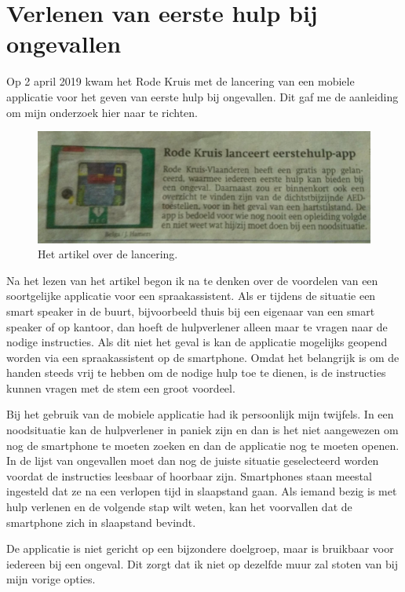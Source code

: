 \section{Verlenen van eerste hulp bij ongevallen}
Op 2 april 2019 kwam het Rode Kruis met de lancering van een mobiele applicatie voor het geven van eerste hulp bij ongevallen. Dit gaf me de aanleiding om mijn onderzoek hier naar te richten.

\begin{figure}[H]
    \centering
    \includegraphics[width=0.8\linewidth]{img/artikelRodeKruisApp}
    \caption{Het artikel over de lancering. \autocite{Hamers2019}}
    \label{fig:artikel-ehboapp}
\end{figure}

Na het lezen van het artikel begon ik na te denken over de voordelen van een soortgelijke applicatie voor een spraakassistent. Als er tijdens de situatie een smart speaker in de buurt, bijvoorbeeld thuis bij een eigenaar van een smart speaker of op kantoor, dan hoeft de hulpverlener alleen maar te vragen naar de nodige instructies. Als dit niet het geval is kan de applicatie mogelijks geopend worden via een spraakassistent op de smartphone. Omdat het belangrijk is om de handen steeds vrij te hebben om de nodige hulp toe te dienen, is de instructies kunnen vragen met de stem een groot voordeel.

Bij het gebruik van de mobiele applicatie had ik persoonlijk mijn twijfels. In een noodsituatie kan de hulpverlener in paniek zijn en dan is het niet aangewezen om nog de smartphone te moeten zoeken en dan de applicatie nog te moeten openen. In de lijst van ongevallen moet dan nog de juiste situatie geselecteerd worden voordat de instructies leesbaar of hoorbaar zijn. Smartphones staan meestal ingesteld dat ze na een verlopen tijd in slaapstand gaan. Als iemand bezig is met hulp verlenen en de volgende stap wilt weten, kan het voorvallen dat de smartphone zich in slaapstand bevindt.

De applicatie is niet gericht op een bijzondere doelgroep, maar is bruikbaar voor iedereen bij een ongeval. Dit zorgt dat ik niet op dezelfde muur zal stoten van bij mijn vorige opties.